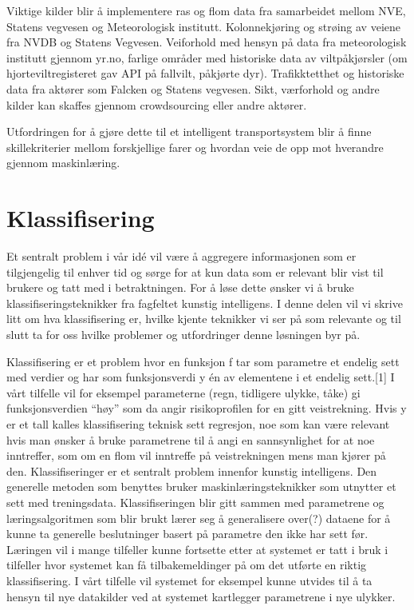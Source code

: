 \documentclass[a4paper,norsk,oneside]{book}
\begin{document}
Viktige kilder blir å implementere ras og flom data fra samarbeidet mellom NVE, Statens vegvesen og Meteorologisk institutt. Kolonnekjøring og strøing av veiene fra NVDB og Statens Vegvesen. Veiforhold med hensyn på data fra meteorologisk institutt gjennom yr.no, farlige områder med historiske data av viltpåkjørsler (om hjorteviltregisteret gav API på fallvilt, påkjørte dyr). Trafikktetthet og historiske data fra aktører som Falcken og Statens vegvesen. Sikt, værforhold og andre kilder kan skaffes gjennom crowdsourcing eller andre aktører.

Utfordringen for å gjøre dette til et intelligent transportsystem blir å finne skillekriterier mellom forskjellige farer og hvordan veie de opp mot hverandre gjennom maskinlæring.

\section{Klassifisering}
\label{sec:klassifisering}

Et sentralt problem i vår idé vil være å aggregere informasjonen som er tilgjengelig til enhver tid og sørge for at kun data som er relevant blir vist til brukere og tatt med i betraktningen.  For å løse dette ønsker vi å bruke klassifiseringsteknikker fra fagfeltet kunstig intelligens. I denne delen vil vi skrive litt om hva klassifisering er, hvilke kjente teknikker vi ser på som relevante og til slutt ta for oss hvilke problemer og utfordringer denne løsningen byr på.

Klassifisering er et problem hvor en funksjon f tar som parametre et endelig sett med verdier og har som funksjonsverdi y én av elementene i et endelig sett.[1] I vårt tilfelle vil for eksempel parameterne (regn, tidligere ulykke, tåke) gi funksjonsverdien “høy” som da angir risikoprofilen for en gitt veistrekning. Hvis y er et tall kalles klassifisering teknisk sett regresjon, noe som kan være relevant hvis man ønsker å bruke parametrene til å angi en sannsynlighet for at noe inntreffer, som om en flom vil inntreffe på veistrekningen mens man kjører på den.
Klassifiseringer er et sentralt problem innenfor kunstig intelligens. Den generelle metoden som benyttes bruker maskinlæringsteknikker som utnytter et sett med treningsdata. Klassifiseringen blir gitt sammen med parametrene og læringsalgoritmen som blir brukt lærer seg å generalisere over(?) dataene for å kunne ta generelle beslutninger basert på parametre den ikke har sett før. Læringen vil i mange tilfeller kunne fortsette etter at systemet er tatt i bruk i tilfeller hvor systemet kan få tilbakemeldinger på om det utførte en riktig klassifisering. I vårt tilfelle vil systemet for eksempel kunne utvides til å ta hensyn til nye datakilder ved at systemet kartlegger parametrene i nye ulykker.	
\end{document}
